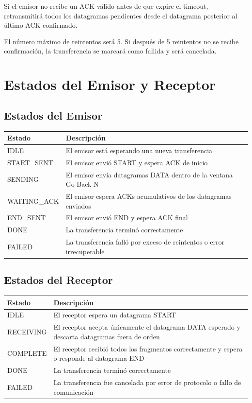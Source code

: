 \documentclass[12pt]{article}
\begin{document}
Si el emisor no recibe un ACK válido antes de que expire el timeout, retransmitirá todos los datagramas pendientes desde el datagrama posterior al último ACK confirmado.

El número máximo de reintentos será 5. Si después de 5 reintentos no se recibe confirmación, la transferencia se marcará como fallida y será cancelada.

\section{Estados del Emisor y Receptor}

\subsection{Estados del Emisor}

\begin{table}[h]
\centering
\begin{tabular}{|l|p{9cm}|}
\hline
Estado & Descripción \\
\hline
IDLE & El emisor está esperando una nueva transferencia \\
\hline
START\_SENT & El emisor envió START y espera ACK de inicio \\
\hline
SENDING & El emisor envía datagramas DATA dentro de la ventana Go-Back-N \\
\hline
WAITING\_ACK & El emisor espera ACKs acumulativos de los datagramas enviados \\
\hline
END\_SENT & El emisor envió END y espera ACK final \\
\hline
DONE & La transferencia terminó correctamente \\
\hline
FAILED & La transferencia falló por exceso de reintentos o error irrecuperable \\
\hline
\end{tabular}
\end{table}

\subsection{Estados del Receptor}

\begin{table}[h]
\centering
\begin{tabular}{|l|p{9cm}|}
\hline
Estado & Descripción \\
\hline
IDLE & El receptor espera un datagrama START \\
\hline
RECEIVING & El receptor acepta únicamente el datagrama DATA esperado y descarta datagramas fuera de orden \\
\hline
COMPLETE & El receptor recibió todos los fragmentos correctamente y espera o responde al datagrama END \\
\hline
DONE & La transferencia terminó correctamente \\
\hline
FAILED & La transferencia fue cancelada por error de protocolo o fallo de comunicación \\
\hline
\end{tabular}
\end{table}
\end{document}
